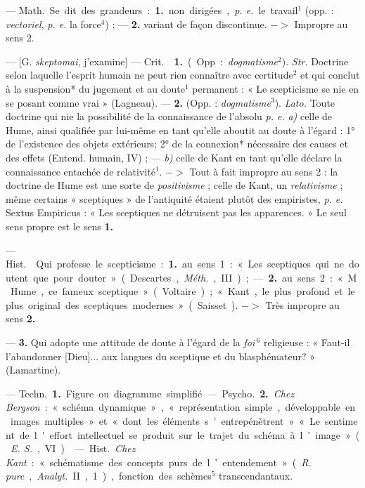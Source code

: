 \begin{itemize}[leftmargin=1cm, label=, itemsep=1pt]
 — \si{Math.} Se dit des grandeurs : {\bf 1.} non dirigées,
{\it p. e.} le travail$^1$ (opp. : {\it vectoriel}, {\it p. e.} la
force$^4$) ; — {\bf 2.} variant de façon discontinue. $->$ Impropre au sens 2.

 — [G. {\it skeptomai}, j'examine] — \si{Crit.}
 {\bf 1.} (Opp. : {\it dogma\-tisme}$^2$). {\it Str.} Doctrine
selon laquelle l'esprit humain ne peut rien connaître avec certitude$^2$ et
qui conclut à la suspension* du jugement et au doute$^1$ permanent : « Le
scepticisme se nie en se posant comme vrai » (Lagneau). — {\bf 2.} (Opp. :
{\it dogmatisme}$^3$). {\it Lato.} Toute doctrine qui nie la possibilité de
la connaissance de l'absolu {\it p. e.} {\it a)} celle de Hume, ainsi
qualifiée par lui-même en tant qu’elle aboutit au doute à l'égard : 1° de
l’existence des objets extérieurs; 2° de la connexion* nécessaire des causes
et des effets (Entend. humain, IV) ; — {\it b)} celle de Kant en tant qu’elle
déclare la connaissance entachée de relativité$^1$. $->$ Tout à fait impropre
au sens 2 : la doctrine de Hume est une sorte de {\it positivisme} ; celle de
Kant, un {\it relativisme} ; même certains « sceptiques » de l'antiquité
étaient plutôt des empiristes, {\it p. e.} Sextus Empiricus : « Les
sceptiques ne détruisent pas les apparences. » Le seul sens propre est le
sens {\bf 1.}

 — \si{Hist.}  Qui professe le scepticisme : {\bf 1.} au
sens 1 : « Les sceptiques qui ne doutent que pour douter » (Descartes,
{\it Méth.}, III) ; —  {\bf 2.} au sens 2 : « M. Hume, ce fameux
sceptique... » (Voltaire) ; « Kant, le
plus profond et le plus original des sceptiques modernes... » (Saisset).
$->$ Très impropre au sens {\bf 2.}

—  {\bf 3.} Qui adopte une attitude de doute à l’égard de
la {\it foi}$\,^6$ religieuse : « Faut-il l’abandonner [Dieu]... aux langues
du sceptique et du blasphémateur? » (Lamartine).

 — \si{Techn.} {\bf 1.} Figure ou diagramme simplifié. —
\si{Psycho.} {\bf 2.} {\it Chez Bergson} : « schéma dynamique »,
« représentation simple, développable en images multiples » et « dont les
éléments s’entrepénètrent » « Le sentiment de l'effort intellectuel se
produit sur le trajet du schéma à l’image » ({\it E. S.}, VI).

 — \si{Hist.} {\it Chez Kant} : « schématisme des concepts
purs de l’entendement » ({\it R. pure}, {\it Analyt.} II, 1), fonction des
schèmes$^5$ transcendantaux.


\end{itemize}
